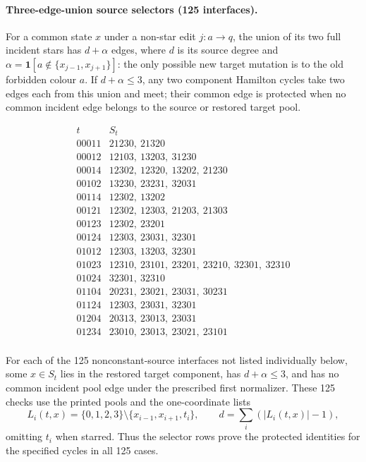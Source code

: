 \paragraph{Three-edge-union source selectors (125 interfaces).}
For a common state $x$ under a non-star edit $j:a\to q$, the union of its
two full incident stars has $d+\alpha$ edges, where $d$ is its source
degree and $\alpha=\mathbf1[a\notin\{x_{j-1},x_{j+1}\}]$:
the only possible new target mutation is to the old forbidden colour $a$.
If $d+\alpha\le3$, any two component Hamilton cycles take two edges
each from this union and meet; their common edge is protected when
no common incident edge belongs to the source or restored target pool.

\[\begin{array}{c|l}t&S_t\\\hline
00011&21230,\ 21320\\
00012&12103,\ 13203,\ 31230\\
00014&12302,\ 12320,\ 13202,\ 21230\\
00102&13230,\ 23231,\ 32031\\
00114&12302,\ 13202\\
00121&12302,\ 12303,\ 21203,\ 21303\\
00123&12302,\ 23201\\
00124&12303,\ 23031,\ 32301\\
01012&12303,\ 13203,\ 32301\\
01023&12310,\ 23101,\ 23201,\ 23210,\ 32301,\ 32310\\
01024&32301,\ 32310\\
01104&20231,\ 23021,\ 23031,\ 30231\\
01124&12303,\ 23031,\ 32301\\
01204&20313,\ 23013,\ 23031\\
01234&23010,\ 23013,\ 23021,\ 23101\\
\end{array}\]

For each of the 125 nonconstant-source interfaces not listed individually
below, some $x\in S_t$ lies in the restored
target component, has $d+\alpha\le3$, and has no common incident
pool edge under the prescribed first normalizer. These 125 checks use
the printed pools and the one-coordinate lists
\[
L_i(t,x)=\{0,1,2,3\}\setminus\{x_{i-1},x_{i+1},t_i\},\qquad
d=\sum_i(|L_i(t,x)|-1),
\]
omitting $t_i$ when starred. Thus the selector rows prove the protected
identities for the specified cycles in all 125 cases.

